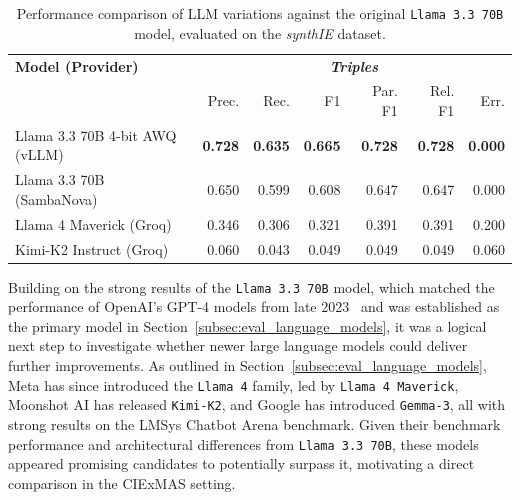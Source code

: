 \documentclass[a4paper,oneside,bibliography=totoc]{scrbook}
\begin{document}
\begin{table}[h]
  \centering
  \begin{tabular}{p{5cm}|rrrrrr}
    \toprule
    \textbf{Model (Provider)}      & \multicolumn{6}{c}{\textit{\textbf{Triples}}}                                                                                      \\
                                   & Prec.                                         & Rec.           & F1             & Par. F1        & Rel. F1        & Err.           \\
    \midrule
    Llama 3.3 70B 4-bit AWQ (vLLM) & \textbf{0.728}                                & \textbf{0.635} & \textbf{0.665} & \textbf{0.728} & \textbf{0.728} & \textbf{0.000} \\
    Llama 3.3 70B (SambaNova)      & 0.650                                         & 0.599          & 0.608          & 0.647          & 0.647          & 0.000          \\
    Llama 4 Maverick (Groq)        & 0.346                                         & 0.306          & 0.321          & 0.391          & 0.391          & 0.200          \\
    Kimi-K2 Instruct (Groq)        & 0.060                                         & 0.043          & 0.049          & 0.049          & 0.049          & 0.060          \\
    \bottomrule
  \end{tabular}
  \caption{Performance comparison of \ac{LLM} variations against the original \texttt{Llama 3.3 70B} model, evaluated on the \textit{synthIE} dataset.}
  \label{tab:model_variation_comparison}
\end{table}

Building on the strong results of the \texttt{Llama 3.3 70B} model, which matched the performance of OpenAI’s GPT-4 models from late 2023~\cite{Chiang2024} and was established as the primary model in Section~\ref{subsec:eval_language_models}, it was a logical next step to investigate whether newer large language models could deliver further improvements. As outlined in Section~\ref{subsec:eval_language_models}, Meta has since introduced the \texttt{Llama 4} family, led by \texttt{Llama 4 Maverick}, Moonshot AI has released \texttt{Kimi-K2}, and Google has introduced \texttt{Gemma-3}, all with strong results on the LMSys Chatbot Arena benchmark. Given their benchmark performance and architectural differences from \texttt{Llama 3.3 70B}, these models appeared promising candidates to potentially surpass it, motivating a direct comparison in the CIExMAS setting.
\end{document}
